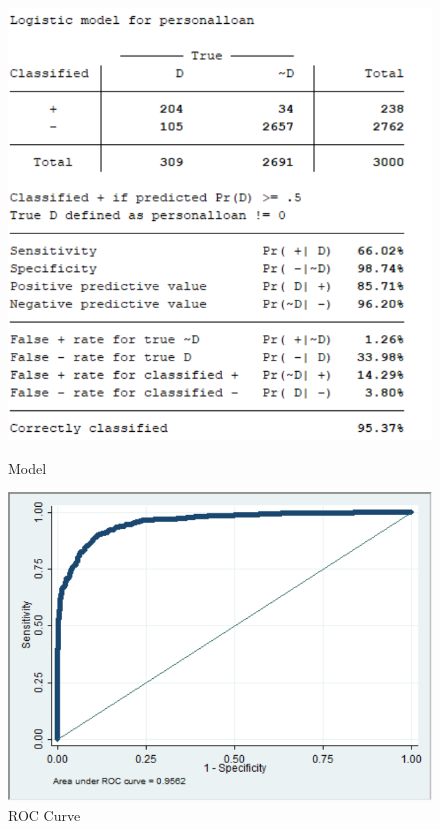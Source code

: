 \documentclass[]{article}
\begin{document}
\begin{figure}[H]
	\centering
	\begin{minipage}{0.48\textwidth}
	\centering
		\includegraphics{tem_files/figure-latex/REG3-1.pdf}
		\caption{Model}
	\end{minipage}
	\begin{minipage}{0.48\textwidth}
	\centering
		\includegraphics{tem_files/figure-latex/REG3-2.pdf}
		\caption{ROC Curve}
	\end{minipage}
\end{figure}
\end{document}
